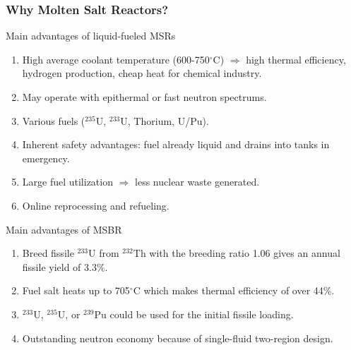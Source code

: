 \begin{frame}
  \frametitle{Why Molten Salt Reactors?}
                  \vspace*{-0.1in}
              \begin{block}{Main advantages of liquid-fueled \glspl{MSR}}
               \begin{enumerate}
               \item High average coolant temperature (600-750$^{\circ}$C) $\Rightarrow$ high thermal efficiency, hydrogen production, cheap heat for chemical industry.
                \item May operate with epithermal or fast neutron spectrums.
                \item Various fuels ($^{235}$U, $^{233}$U, Thorium, U/Pu).
                \item Inherent safety advantages: fuel already liquid and drains into tanks in emergency.
                \item Large fuel utilization $\Rightarrow$ less nuclear waste generated.
                \item Online reprocessing and refueling.
               \end{enumerate}
               \end{block}
               
               \begin{block}{Main advantages of \gls{MSBR}}
               \begin{enumerate}
                \item Breed fissile $^{233}$U from $^{232}$Th with the breeding ratio 1.06 gives an annual 
                fissile yield of 3.3\%.
                \item Fuel salt heats up to 705$^{\circ}$C which makes thermal efficiency of over 44\%.
                \item $^{233}$U, $^{235}$U, or $^{239}$Pu could be used for the initial fissile loading.
                \item Outstanding neutron economy because of single-fluid two-region design.
               \end{enumerate}
               \end{block}

\end{frame}

